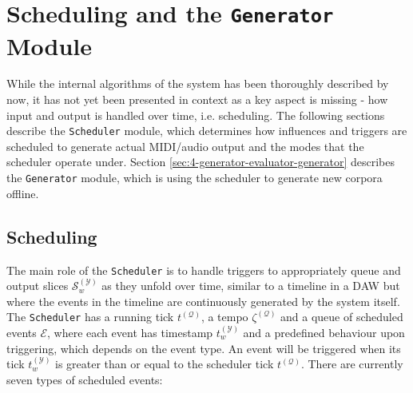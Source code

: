 \section{Scheduling and the \texttt{Generator} Module}\label{sec:4-generator-evaluator}
While the internal algorithms of the system has been thoroughly described by now, it has not yet been presented in context as a key aspect is missing - how input and output is handled over time, i.e. scheduling. The following sections describe the \texttt{Scheduler} module, which determines how influences and triggers are scheduled to generate actual MIDI/audio output and the modes that the scheduler operate under. Section \ref{sec:4-generator-evaluator-generator} describes the \texttt{Generator} module, which is using the scheduler to generate new corpora offline.

\subsection{Scheduling}\label{sec:4-generator-evaluator-scheduler}
The main role of the \texttt{Scheduler} is to handle triggers to appropriately queue and output slices $\mathcal S^{(\mathcal Y)}_w$ as they unfold over time, similar to a timeline in a DAW but where the events in the timeline are continuously generated by the system itself. The \texttt{Scheduler} has a running tick $t^{(\mathcal Q)}$, a tempo $\zeta^{(\mathcal Q)}$ and a queue of scheduled events $\mathcal E$, where each event has timestamp $t^{(\mathcal Y)}_w$ and a predefined behaviour upon triggering, which depends on the event type. An event will be triggered when its tick $t^{(\mathcal Y)}_w$ is greater than or equal to the scheduler tick $t^{(\mathcal Q)}$. There are currently seven types of scheduled events:

